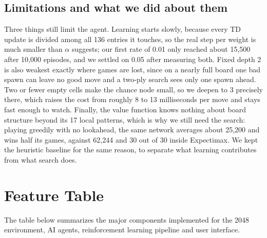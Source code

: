 \documentclass[11pt]{article}
\begin{document}
\subsection{Limitations and what we did about them}

Three things still limit the agent. Learning starts slowly, because every TD update is divided among all 136 entries it touches, so the real step per weight is much smaller than $\alpha$ suggests; our first rate of 0.01 only reached about 15,500 after 10,000 episodes, and we settled on 0.05 after measuring both. Fixed depth 2 is also weakest exactly where games are lost, since on a nearly full board one bad spawn can leave no good move and a two-ply search sees only one spawn ahead. Two or fewer empty cells make the chance node small, so we deepen to 3 precisely there, which raises the cost from roughly 8 to 13 milliseconds per move and stays fast enough to watch. Finally, the value function knows nothing about board structure beyond its 17 local patterns, which is why we still need the search: playing greedily with no lookahead, the same network averages about 25,200 and wins half its games, against 62,244 and 30 out of 30 inside Expectimax. We kept the heuristic baseline for the same reason, to separate what learning contributes from what search does.

\clearpage
\section{Feature Table}

The table below summarizes the major components implemented for the 2048 environment, AI agents, reinforcement learning pipeline and user interface.
\end{document}
